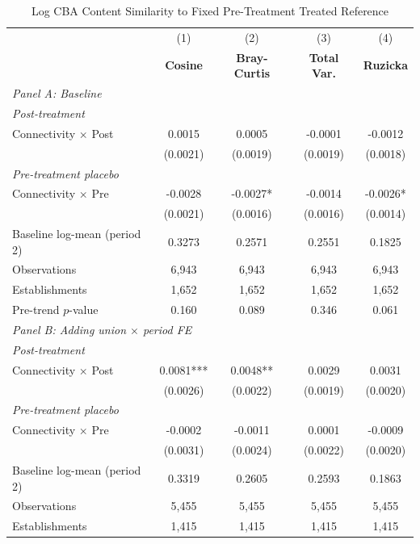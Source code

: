 \begin{table}[H]
\centering
\caption{Log CBA Content Similarity to Fixed Pre-Treatment Treated Reference}
\label{tab:pretreat_ref_uncorr_w_ln_cba_similarity}
\scriptsize
\setlength{\tabcolsep}{8pt}
\begin{tabular}{lcccc}
\hline\hline
 & (1) & (2) & (3) & (4) \\
 & \textbf{Cosine} & \textbf{Bray-Curtis} & \textbf{Total Var.} & \textbf{Ruzicka} \\
\hline
\multicolumn{5}{l}{\textit{Panel A: Baseline}} \\
\multicolumn{5}{l}{\textit{Post-treatment}} \\
Connectivity $\times$ Post & 0.0015 & 0.0005 & -0.0001 & -0.0012 \\
 & (0.0021) & (0.0019) & (0.0019) & (0.0018) \\
\multicolumn{5}{l}{\textit{Pre-treatment placebo}} \\
Connectivity $\times$ Pre & -0.0028 & -0.0027* & -0.0014 & -0.0026* \\
 & (0.0021) & (0.0016) & (0.0016) & (0.0014) \\
\hline
Baseline log-mean (period 2) & 0.3273 & 0.2571 & 0.2551 & 0.1825 \\
Observations &        6,943 &        6,943 &        6,943 &        6,943 \\
Establishments &        1,652 &        1,652 &        1,652 &        1,652 \\
Pre-trend $p$-value & 0.160 & 0.089 & 0.346 & 0.061 \\
\hline
\multicolumn{5}{l}{\textit{Panel B: Adding union $\times$ period FE}} \\
\multicolumn{5}{l}{\textit{Post-treatment}} \\
Connectivity $\times$ Post & 0.0081*** & 0.0048** & 0.0029 & 0.0031 \\
 & (0.0026) & (0.0022) & (0.0019) & (0.0020) \\
\multicolumn{5}{l}{\textit{Pre-treatment placebo}} \\
Connectivity $\times$ Pre & -0.0002 & -0.0011 & 0.0001 & -0.0009 \\
 & (0.0031) & (0.0024) & (0.0022) & (0.0020) \\
\hline
Baseline log-mean (period 2) & 0.3319 & 0.2605 & 0.2593 & 0.1863 \\
Observations &        5,455 &        5,455 &        5,455 &        5,455 \\
Establishments &        1,415 &        1,415 &        1,415 &        1,415 \\

\end{tabular}
\end{table}
